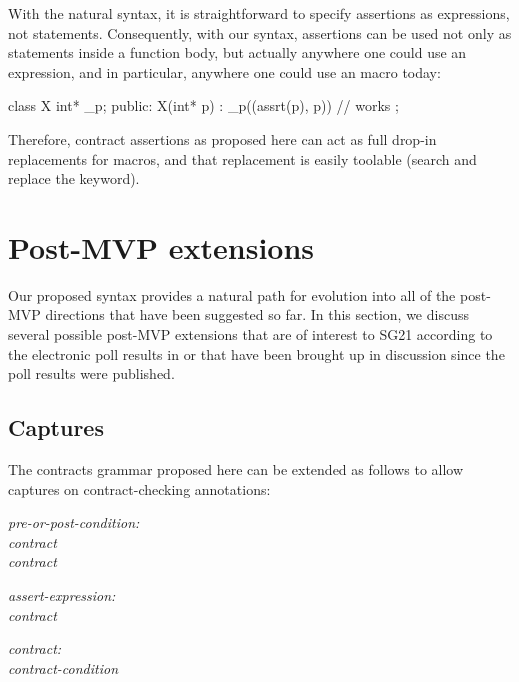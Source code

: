 With the natural syntax, it is straightforward to specify assertions as expressions, not statements. Consequently, with our syntax, assertions can be used not only as statements inside a function body, but actually anywhere one could use an expression, and in particular, anywhere one could use an  macro today:

\vspace{2mm}
\begin{codeblock}
class X {
  int* _p;
public:
  X(int* p) : _p((assrt(p), p)) {}  // works
};
\end{codeblock} 
\vspace{2mm}

Therefore, contract assertions as proposed here can act as full drop-in replacements for  macros, and that replacement is easily toolable (search and replace the keyword).


\section{Post-MVP extensions}

Our proposed syntax provides a natural path for evolution into all of the post-MVP directions that have been suggested so far. In this section, we discuss several possible post-MVP extensions that are of interest to SG21 according to the electronic poll results in \cite{P2885R2} or that have been brought up in discussion since the poll results were published.

\subsection{Captures}
\label{subsec:captures}

The contracts grammar proposed here can be extended as follows to allow captures on contract-checking annotations:

\begin{adjustwidth}{0.5cm}{0.5cm}

\emph{pre-or-post-condition:} \\
\phantom{~~~} \emph{contract} \\
\phantom{~~~} \emph{contract}

\emph{assert-expression:} \\
\phantom{~~~} \emph{contract}

\emph{contract:} \\
\phantom{~~~} \emph{contract-condition}

 \\
\phantom{~~~}

\end{adjustwidth}

